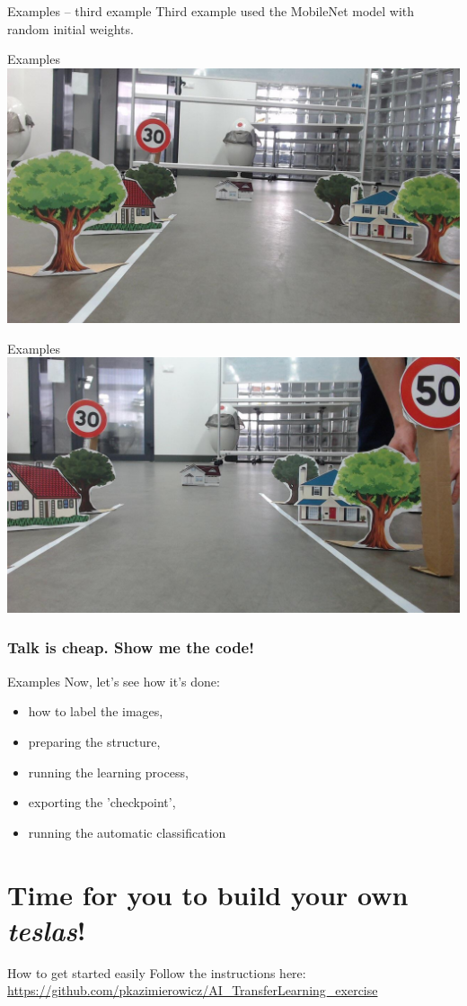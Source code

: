 \documentclass[aspectratio=1610,english]{beamer} %
\begin{document}
	
  	\begin{frame}{Examples -- third example}
		Third example used the MobileNet model with random initial weights.
	\end{frame}
  	\begin{frame}{Examples}
		\includegraphics[scale=0.3]{examples/no_fine_tune_checkpoint_1000_step/session_one-6.jpg}
	\end{frame}
  	\begin{frame}{Examples}
		\includegraphics[scale=0.3]{examples/no_fine_tune_checkpoint_1000_step/session_one-10.jpg}
	\end{frame}
	
  	
  	\section{Talk is cheap. Show me the code!}
	\begin{frame}{Examples}
	Now, let's see how it's done:
		\begin{itemize}
			\item how to label the images,
			\item preparing the structure,
			\item running the learning process,
			\item exporting the 'checkpoint',
			\item running the automatic classification
		\end{itemize}
	\end{frame}
	
	
\part{Time for you to build your own \textit{teslas}!}
	\begin{frame}{How to get started easily}
	Follow the instructions here:
	\url{https://github.com/pkazimierowicz/AI_TransferLearning_exercise}
	\end{frame}
\end{document}
